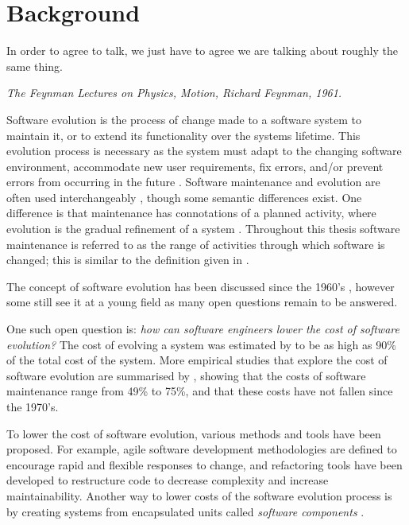 \chapter{Background}
\label{background}
\epigraph{
In order to agree to talk, we just have to agree we are talking about roughly the same thing.
}
{\textit{The Feynman Lectures on Physics, Motion, Richard Feynman, 1961.}}

Software evolution \citep{lehman1980} is the process of change made to a software system to maintain it, or to extend its functionality over the systems lifetime.
This evolution process is necessary as the system must adapt to the changing software environment, accommodate new user requirements, 
fix errors, and/or prevent errors from occurring in the future \citep{IsoIec2006}.
Software maintenance and evolution are often used interchangeably \citep{Godfrey2008}, though some semantic differences exist.
One difference is that maintenance has connotations of a planned activity, where evolution is the gradual refinement of a system \citep{lehman1980}.
Throughout this thesis software maintenance is referred to as the range of activities through which software is changed; this is similar to the definition given in \citep{lehman1980}.

The concept of software evolution has been discussed since the 1960's \citep{Lehman1969}, 
however some still see it at a young field \citep{Godfrey2008} as many open questions remain to be answered.

One such open question is: \textit{how can software engineers lower the cost of software evolution?}
The cost of evolving a system was estimated by \cite{Brooks1975} to be as high as 90\% of the total cost of the system.
More empirical studies that explore the cost of software evolution are summarised by \cite{Grubb2003}, showing that the costs of software maintenance range from 49\% to 75\%, 
and that these costs have not fallen since the 1970's. 

To lower the cost of software evolution, various methods and tools have been proposed.
For example, agile software development methodologies \citep{beck2001manifesto} are defined to encourage rapid and flexible responses to change,
and refactoring tools \citep{fowler1999refactoring} have been developed to restructure code to decrease complexity and increase maintainability. 
Another way to lower costs of the software evolution process is by creating systems from encapsulated units called \textit{software components} \citep{Szyperski2002}.

